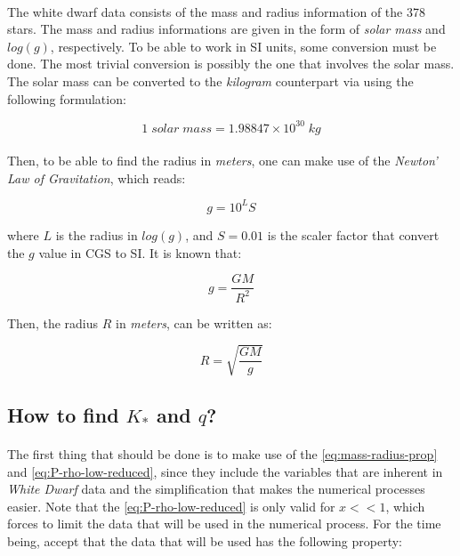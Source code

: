\documentclass[letterpaper,12pt]{article}
\begin{document}
\paragraph{} The white dwarf data consists of the mass and radius information of the 378 stars. The mass and radius informations are given in the form of \textit{solar mass} and $\mathit{log(g)}$, respectively. To be able to work in SI units, some conversion must be done. The most trivial conversion is possibly the one that involves the solar mass. The solar mass can be converted to the \textit{kilogram} counterpart via using the following formulation:

\begin{equation*}
    1 \; solar \; mass = 1.98847 \times 10^{30} \; kg
\end{equation*}

\paragraph{} Then, to be able to find the radius in \textit{meters}, one can make use of the \textit{Newton' Law of Gravitation}, which reads:

\begin{equation*}
    g = 10 ^ {L} S
\end{equation*}

where $L$ is the radius in $\mathit{log(g)}$, and $S = 0.01$ is the scaler factor that convert the $g$ value in CGS to SI. It is known that:

\begin{equation*}
    g = \frac{GM}{R^2}
\end{equation*}

Then, the radius $R$ in \textit{meters}, can be written as:

\begin{equation*}
    R = \sqrt{\frac{GM}{g}}
\end{equation*}


\subsection{How to find $K_*$ and $q$?}

\paragraph{} The first thing that should be done is to make use of the \eqref{eq:mass-radius-prop} and \eqref{eq:P-rho-low-reduced}, since they include the variables that are inherent in \textit{White Dwarf} data and the simplification that makes the numerical processes easier. Note that the \eqref{eq:P-rho-low-reduced} is only valid for $x<<1$, which forces to limit the data that will be used in the numerical process. For the time being, accept that the data that will be used has the following property:
\end{document}
